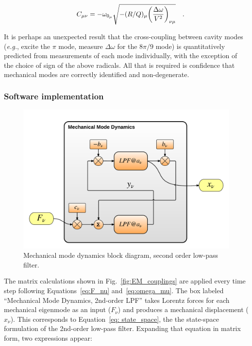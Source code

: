 \documentclass[a4paper,12pt]{article}
\begin{document}
\begin{equation}
 C_{\mu\nu} = -\omega_{0_{\mu}} \sqrt{-(R/Q)_{\mu}{ \left(\frac{\Delta \omega}{ V^2}\right)_{\nu \mu}}}\rlap{~~~.}
\end{equation}

It is perhaps an unexpected result that the cross-coupling between cavity modes ({\it e.g.}, excite the $\pi$ mode, measure $\Delta\omega$ for the $8\pi/9$ mode) is quantitatively predicted from measurements of each mode individually, with the exception of the choice of sign of the above radicals.  All that is required is confidence that mechanical modes are correctly identified and non-degenerate.

\subsubsection{Software implementation}

\begin{figure}
\centering
\includegraphics[scale=0.55]{../figures/mech_state_space_blocks.png}
\caption{Mechanical mode dynamics block diagram, second order low-pass filter.}
\label{fig:mech_state_space}
\end{figure}

The matrix calculations shown in Fig.~\ref{fig:EM_couplings} are applied every time step following Equations~\ref{eq:F_nu} and~\ref{eq:omega_mu}. The box labeled ``Mechanical Mode Dynamics, 2nd-order LPF'' takes Lorentz forces for each mechanical eigenmode as an input ($F_{\nu}$) and produces a mechanical displacement ($x_{\nu}$). This corresponds to Equation~\ref{eq: state_space}, the the state-space formulation of the 2nd-order low-pass filter. Expanding that equation in matrix form, two expressions appear:
\end{document}
